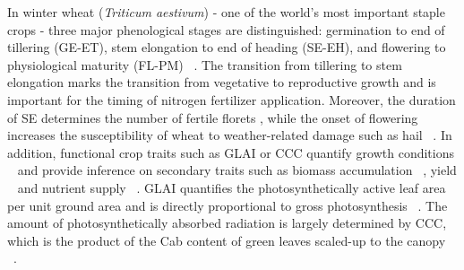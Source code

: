 In winter wheat (\textsl{Triticum aestivum}) - one of the world's most important staple crops - three major phenological stages are distinguished: germination to end of tillering (GE-ET), stem elongation to end of heading (SE-EH), and flowering to physiological maturity (FL-PM) ~\citep{hay_convergence_1991}. The transition from tillering to stem elongation marks the transition from vegetative to reproductive growth and is important for the timing of nitrogen fertilizer application. Moreover, the duration of SE determines the number of fertile florets \citep{gonzalez_grain_2003}, while the onset of flowering increases the susceptibility of wheat to weather-related damage such as hail ~\citep{holman_impact_2022}. In addition, functional crop traits such as \gls{GLAI} or \gls{CCC} quantify growth conditions ~\citep{gitelson_relationships_2014} and provide inference on secondary traits such as biomass accumulation ~\citep{gitelson_remote_2003}, yield ~\citep{huang_improving_2015,chen_improving_2018,hashimoto_feasibility_2022} and nutrient supply ~\citep{delloye_retrieval_2018}. \gls{GLAI} quantifies the photosynthetically active leaf area per unit ground area and is directly proportional to gross photosynthesis ~\citep{gitelson_remote_2003}. The amount of photosynthetically absorbed radiation is largely determined by \gls{CCC}, which is the product of the \gls{Cab} content of green leaves scaled-up to the canopy ~\citep{gitelson_relationships_2014}.

